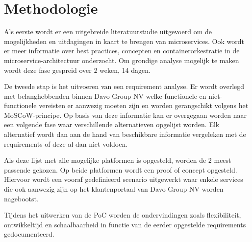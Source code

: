 
\section{Methodologie}%
\label{sec:methodologie}
Als eerste wordt er een uitgebreide literatuurstudie uitgevoerd om de mogelijkheden en uitdagingen in kaart te brengen van microservices. Ook wordt er meer informatie over best practices, concepten en containerorkestratie in de microservice-architectuur onderzocht. Om grondige analyse mogelijk te maken wordt deze fase gespreid over 2 weken, 14 dagen.

De tweede stap is het uitvoeren van een requirement analyse. Er wordt overlegd met belanghebbenden binnen Davo Group NV welke functionele en niet-functionele vereisten er aanwezig moeten zijn en worden gerangschikt volgens het MoSCoW-principe. Op basis van deze informatie kan er overgegaan worden naar een volgende fase waar verschillende alternatieven opgelijst worden. Elk alternatief wordt dan aan de hand van beschikbare informatie vergeleken met de requirements of deze al dan niet voldoen. 

Als deze lijst met alle mogelijke platformen is opgesteld, worden de 2 meest passende gekozen. Op beide platformen wordt een proof of concept opgesteld. Hiervoor wordt een vooraf gedefinieerd scenario uitgewerkt waar enkele services die ook aanwezig zijn op het klantenportaal van Davo Group NV worden nagebootst. 

Tijdens het uitwerken van de PoC worden de ondervindingen zoals flexibiliteit, ontwikkeltijd en schaalbaarheid in functie van de eerder opgestelde requirements gedocumenteerd.

